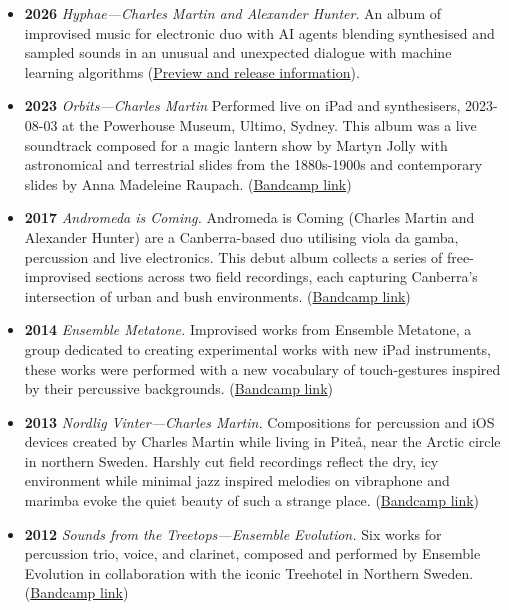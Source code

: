 \documentclass[11pt, a4paper, oneside]{article}
\begin{document}
\begin{itemize}

\item \textbf{2026} \emph{Hyphae---Charles Martin and Alexander Hunter}. An album of improvised music for electronic duo with AI agents blending synthesised and sampled sounds in an unusual and unexpected dialogue with machine learning algorithms (\href{https://charlesmartin.au/projects/hyphae/}{Preview and release information}).

\item \textbf{2023} \emph{Orbits---Charles Martin} Performed live on iPad and synthesisers, 2023-08-03 at the Powerhouse Museum, Ultimo, Sydney. This album was a live soundtrack composed for a magic lantern show by Martyn Jolly with astronomical and terrestrial slides from the 1880s-1900s and contemporary slides by Anna Madeleine Raupach.
(\href{https://charlesmartin.bandcamp.com/album/orbits}{Bandcamp link})

\item \textbf{2017} \emph{Andromeda is Coming.} Andromeda is Coming
  (Charles Martin and Alexander Hunter) are a Canberra-based duo
  utilising viola da gamba, percussion and live electronics. This
  debut album collects a series of free-improvised sections across two
  field recordings, each capturing Canberra's intersection of urban
  and bush environments. (\href{http://collectedresonances.bandcamp.com/album/andromeda-is-coming}{Bandcamp link})

\item \textbf{2014} \emph{Ensemble Metatone.} Improvised works from
  Ensemble Metatone, a group dedicated to creating experimental works
  with new iPad instruments, these works were performed with a new
  vocabulary of touch-gestures inspired by their percussive
  backgrounds.
  (\href{http://charlesmartin.bandcamp.com/album/ensemble-metatone}{Bandcamp
    link})

\item \textbf{2013} \emph{Nordlig Vinter---Charles Martin.}
  Compositions for percussion and iOS devices created by Charles
  Martin while living in Pite{\aa}, near the Arctic circle in northern
  Sweden. Harshly cut field recordings reflect the dry, icy
  environment while minimal jazz inspired melodies on vibraphone and
  marimba evoke the quiet beauty of such a strange place.
  (\href{http://charlesmartin.bandcamp.com/album/nordlig-vinter}{Bandcamp
    link})

\item \textbf{2012} \emph{Sounds from the Treetops---Ensemble
    Evolution.} Six works for percussion trio, voice, and clarinet,
  composed and performed by Ensemble Evolution in collaboration with
  the iconic Treehotel in Northern Sweden.
  (\href{http://ensembleevolution.bandcamp.com/album/sounds-from-the-treetops}{Bandcamp
    link})


\end{itemize}
\end{document}

